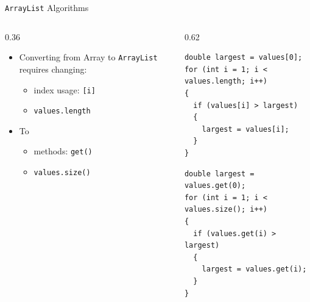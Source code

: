 \documentclass[aspectratio=43,10pt,t]{beamer}
\newcommand{\code}[1]{\texttt{#1}}
\begin{document}
\begin{frame}[fragile]{\texttt{ArrayList} Algorithms}
  \begin{columns}[T]
    \begin{column}{0.36\textwidth}
      \begin{itemize}
        \item Converting from Array to \code{ArrayList} requires changing:
          \begin{itemize}
            \item index usage: \code{[i]}
            \item \code{values.length}
          \end{itemize}
        \item To
          \begin{itemize}
            \item methods: \code{get()}
            \item \code{values.size()}
          \end{itemize}
      \end{itemize}
    \end{column}
    \begin{column}{0.62\textwidth}
\begin{lstlisting}
double largest = values[0];
for (int i = 1; i < values.length; i++)
{
  if (values[i] > largest)
  {
    largest = values[i];
  }
}
\end{lstlisting}
      \vskip2mm
\begin{lstlisting}
double largest = values.get(0);
for (int i = 1; i < values.size(); i++)
{
  if (values.get(i) > largest)
  {
    largest = values.get(i);
  }
}
\end{lstlisting}
    \end{column}
  \end{columns}
\end{frame}
\end{document}
